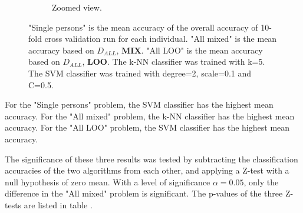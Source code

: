 \begin{figure}[h]
\begin{subfigure}{\figscale}
\caption[k-NN and SVM classification accuracies, zoomed view.]
{
Zoomed view.
}
\label{fig:knn-vs-svm-zoomed}
\end{subfigure}
\caption[k-NN and SVM classification accuracies]{
"Single persons" is the mean accuracy of the overall accuracy of 10-fold cross validation run for each individual.
"All mixed" is the mean accuracy based on $D_{ALL}$, \textbf{MIX}.
"All LOO" is the mean accuracy based on $D_{ALL}$, \textbf{LOO}.
The k-NN classifier was trained with k=5. The SVM classifier was trained with degree=2, scale=0.1 and C=0.5.
}
\end{figure}

For the "Single persons" problem, the SVM classifier has the highest mean accuracy.
For the "All mixed" problem, the k-NN classifier has the highest mean accuracy.
For the "All LOO" problem, the SVM classifier has the highest mean accuracy.

The significance of these three results was tested by subtracting the classification
accuracies of the two algorithms from each other,
and applying a Z-test with a null hypothesis of zero mean.
With a level of significance \(\alpha=0.05\),
only the difference in the "All mixed" problem is significant.
The p-values of the three Z-tests are listed in table .
